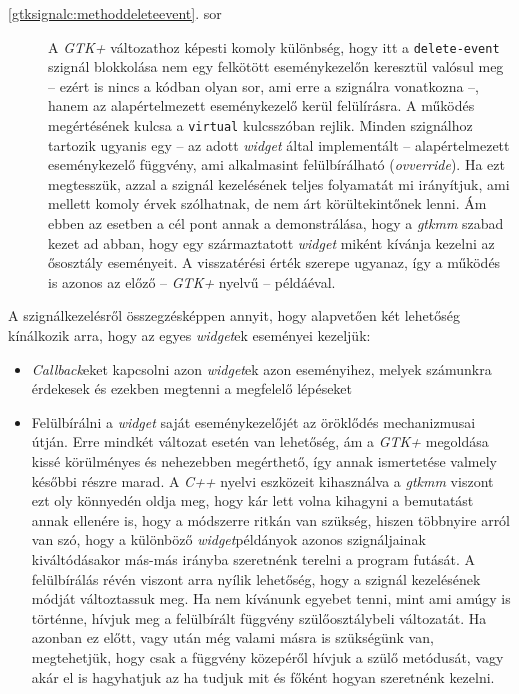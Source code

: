 \begin{description}
 \item[\ref{gtksignalc:methoddeleteevent}. sor] A \textit{GTK+} változathoz képesti komoly különbség, hogy itt a \texttt{delete-event} szignál blokkolása nem egy felkötött eseménykezelőn keresztül valósul meg -- ezért is nincs a kódban olyan sor, ami erre a szignálra vonatkozna --, hanem az alapértelmezett eseménykezelő kerül felülírásra. A működés megértésének kulcsa a \texttt{virtual} kulcsszóban rejlik. Minden szignálhoz tartozik ugyanis egy -- az adott \textit{widget} által implementált -- alapértelmezett eseménykezelő függvény, ami alkalmasint felülbírálható (\textit{ovverride}). Ha ezt megtesszük, azzal a szignál kezelésének teljes folyamatát mi irányítjuk, ami mellett komoly érvek szólhatnak, de nem árt körültekintőnek lenni. Ám ebben az esetben a cél pont annak a demonstrálása, hogy a \textit{gtkmm} szabad kezet ad abban, hogy egy származtatott \textit{widget} miként kívánja kezelni az ősosztály eseményeit. A visszatérési érték szerepe ugyanaz, így a működés is azonos az előző -- \textit{GTK+} nyelvű -- példáéval.
\end{description}

A szignálkezelésről összegzésképpen annyit, hogy alapvetően két lehetőség kínálkozik arra, hogy az egyes \textit{widget}ek eseményei kezeljük:

\begin{itemize}
 \item \textit{Callback}eket kapcsolni azon \textit{widget}ek azon eseményihez, melyek számunkra érdekesek és ezekben megtenni a megfelelő lépéseket

 \item Felülbírálni a \textit{widget} saját eseménykezelőjét az öröklődés mechanizmusai útján. Erre mindkét változat esetén van lehetőség, ám a \textit{GTK+} megoldása kissé körülményes és nehezebben megérthető, így annak ismertetése valmely későbbi részre marad. A \textit{C++} nyelvi eszközeit kihasználva a \textit{gtkmm} viszont ezt oly könnyedén oldja meg, hogy kár lett volna kihagyni a bemutatást annak ellenére is, hogy a módszerre ritkán van szükség, hiszen többnyire arról van szó, hogy a különböző \textit{widget}példányok azonos szignáljainak kiváltódásakor más-más irányba szeretnénk terelni a program futását. A felülbírálás révén viszont arra nyílik lehetőség, hogy a szignál kezelésének módját változtassuk meg. Ha nem kívánunk egyebet tenni, mint ami amúgy is történne, hívjuk meg a felülbírált függvény szülőosztálybeli változatát. Ha azonban ez előtt, vagy után még valami másra is szükségünk van, megtehetjük, hogy csak a függvény közepéről hívjuk a szülő metódusát, vagy akár el is hagyhatjuk az ha tudjuk mit és főként hogyan szeretnénk kezelni.
\end{itemize}

